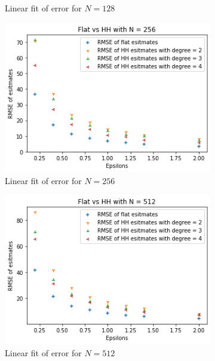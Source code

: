 \documentclass[11pt]{article}
\theoremstyle{definition}
\begin{document}
\begin{figure}[H]
\begin{subfigure}{.4\textwidth}
  \caption{Linear fit of error for $N=128$}
  \label{fig:11}
\end{subfigure}
\begin{subfigure}{.4\textwidth}
  \centering
  \includegraphics[width=\linewidth]{figures/central_flat_hh/flat_beat_hh_N=256.png}
  \caption{Linear fit of error for $N=256$}
  \label{fig:12}
\end{subfigure}
\begin{subfigure}{.4\textwidth}
  \centering
  \includegraphics[width=\linewidth]{figures/central_flat_hh/flat_beat_hh_N=512.png}
  \caption{Linear fit of error for $N=512$}
  \label{fig:13}
\end{subfigure}%
\begin{subfigure}{.4\textwidth}
  \centering

\end{subfigure}
\end{figure}
\end{document}

